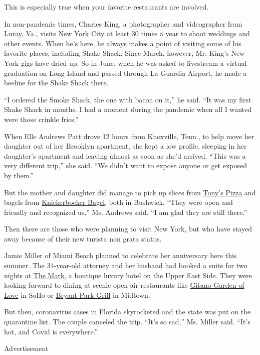 This is especially true when your favorite restaurants are involved.

In non-pandemic times, Charles King, a photographer and videographer
from Luray, Va., visits New York City at least 30 times a year to shoot
weddings and other events. When he's here, he always makes a point of
visiting some of his favorite places, including Shake Shack. Since
March, however, Mr. King's New York gigs have dried up. So in June, when
he was asked to livestream a virtual graduation on Long Island and
passed through La Guardia Airport, he made a beeline for the Shake Shack
there.

``I ordered the Smoke Shack, the one with bacon on it,'' he said. ``It
was my first Shake Shack in months. I had a moment during the pandemic
when all I wanted were those crinkle fries.''

When Elle Andrews Patt drove 12 hours from Knoxville, Tenn., to help
move her daughter out of her Brooklyn apartment, she kept a low profile,
sleeping in her daughter's apartment and leaving almost as soon as she'd
arrived. ``This was a very different trip,'' she said. ``We didn't want
to expose anyone or get exposed by them.''

But the mother and daughter did manage to pick up slices from
\href{https://originaltonysofbushwick.com/}{Tony's Pizza} and bagels
from \href{http://www.kbbagel.com/}{Knickerbocker Bagel}, both in
Bushwick. ``They were open and friendly and recognized us,'' Ms. Andrews
said. ``I am glad they are still there.''

Then there are those who were planning to visit New York, but who have
stayed away because of their new turista non grata status.

Jamie Miller of Miami Beach planned to celebrate her anniversary here
this summer. The 34-year-old attorney and her husband had booked a suite
for two nights at
\href{https://www.themarkhotel.com/?gclid=EAIaIQobChMIrKP4jvDu6gIVFaSzCh3SdAsCEAAYASAAEgJM-vD_BwE}{The
Mark}, a boutique luxury hotel on the Upper East Side. They were looking
forward to dining at scenic open-air restaurants like
\href{https://grupogitano.com/}{Gitano Garden of Love} in SoHo or
\href{https://bryantparkgrillnyc.com/}{Bryant Park Grill} in Midtown.

But then, coronavirus cases in Florida skyrocketed and the state was put
on the quarantine list. The couple canceled the trip. ``It's so sad,''
Ms. Miller said. ``It's hot, and Covid is everywhere.''

Advertisement

